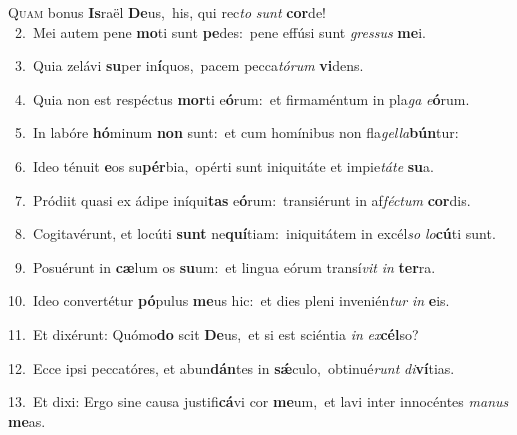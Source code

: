 \lettrine{\initial\textcolor{\initialcolor}{Q}}{uam} bonus \textbf{Is}\-raël \textbf{De}\-us,~\star his, qui rec\textit{to} \textit{sunt} \textbf{cor}\-de!\\
{\numbfont\textcolor{\numbcolor}{~2.}}~Mei autem pene \textbf{mo}\-ti sunt \textbf{pe}\-des:~\star pene effúsi sunt \textit{gres}\-\textit{sus} \textbf{me}\-i.\par
{\numbfont\textcolor{\numbcolor}{~3.}}~Quia zelávi \textbf{su}\-per in\-\textbf{í}\-quos,~\star pacem pecca\-\textit{tó}\-\textit{rum} \textbf{vi}\-dens.\par
{\numbfont\textcolor{\numbcolor}{~4.}}~Quia non est respéctus \textbf{mor}\-ti e\-\textbf{ó}\-rum:~\star et firmaméntum in pla\textit{ga} \textit{e}\-\textbf{ó}rum.\par
{\numbfont\textcolor{\numbcolor}{~5.}}~In labóre \textbf{hó}\-minum \textbf{non} sunt:~\star et cum homínibus non fla\-\textit{gel}\-\textit{la}\textbf{bún}tur:\par
{\numbfont\textcolor{\numbcolor}{~6.}}~Ideo ténuit \textbf{e}\-os su\-\textbf{pér}\-bia,~\star opérti sunt iniquitáte et impie\-\textit{tá}\-\textit{te} \textbf{su}\-a.\par
{\numbfont\textcolor{\numbcolor}{~7.}}~Pródiit quasi ex ádipe iníqui\textbf{tas} e\-\textbf{ó}\-rum:~\star transiérunt in af\-\textit{féc}\-\textit{tum} \textbf{cor}\-dis.\par
{\numbfont\textcolor{\numbcolor}{~8.}}~Cogitavérunt, et locúti \textbf{sunt} ne\-\textbf{quí}\-tiam:~\star iniquitátem in excél\textit{so} \textit{lo}\-\textbf{cú}ti sunt.\par
{\numbfont\textcolor{\numbcolor}{~9.}}~Posuérunt in \textbf{cæ}\-lum os \textbf{su}\-um:~\star et lingua eórum transí\textit{vit} \textit{in} \textbf{ter}\-ra.\par
{\numbfont\textcolor{\numbcolor}{10.}}~Ideo convertétur \textbf{pó}\-pulus \textbf{me}\-us hic:~\star et dies pleni invenién\textit{tur} \textit{in} \textbf{e}\-is.\par
{\numbfont\textcolor{\numbcolor}{11.}}~Et dixérunt: Quómo\textbf{do} scit \textbf{De}\-us,~\star et si est sciéntia \textit{in} \textit{ex}\-\textbf{cél}so?\par
{\numbfont\textcolor{\numbcolor}{12.}}~Ecce ipsi peccatóres, et abun\-\textbf{dán}\-tes in \textbf{sǽ}\-culo,~\star obtinué\textit{runt} \textit{di}\-\textbf{ví}tias.\par
{\numbfont\textcolor{\numbcolor}{13.}}~Et dixi: Ergo sine causa justifi\-\textbf{cá}\-vi cor \textbf{me}\-um,~\star et lavi inter innocéntes \textit{ma}\-\textit{nus} \textbf{me}\-as.\par
